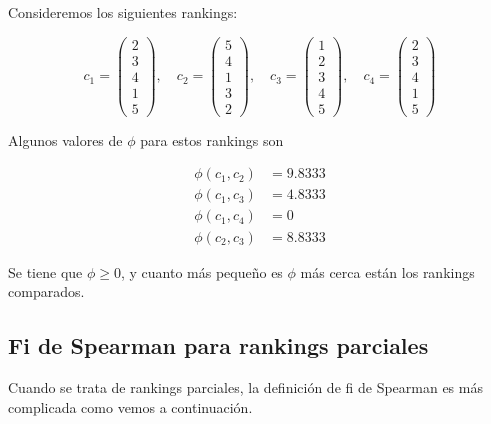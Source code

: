 \begin{ejemplo} \label{ej:fi_spearman_completo}
Consideremos los siguientes rankings:

\begin{equation*}
c_1 = \left( \begin{array}{c}
2\\
3\\
4\\
1\\
5
\end{array} \right), \quad
c_2 = \left( \begin{array}{c}
5\\
4\\
1\\
3\\
2
\end{array} \right), \quad
c_3 = \left( \begin{array}{c}
1\\
2\\
3\\
4\\
5
\end{array} \right), \quad
c_4 = \left( \begin{array}{c}
2\\
3\\
4\\
1\\
5
\end{array} \right)
\end{equation*}

Algunos valores de $\phi$ para estos rankings son

\begin{align*}
\phi(c_1, c_2) & = 9.8333 \\
\phi(c_1, c_3) & = 4.8333\\
\phi(c_1, c_4) & = 0\\
\phi(c_2, c_3) & = 8.8333
\end{align*}  
\end{ejemplo}

Se tiene que $\phi \geq 0$, y cuanto más pequeño es $\phi$ más cerca están los rankings comparados. 

\subsection{Fi de Spearman para rankings parciales}

Cuando se trata de rankings parciales, la definición de fi de Spearman es más complicada como vemos a continuación.

